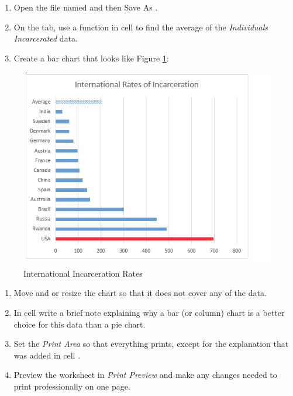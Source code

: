 \begin{enumbox}
	\begin{enumerate}
		\item Open the file named  and then Save As .
		\item On the  tab, use a function in cell  to find the average of the \textit{Individuals Incarcerated} data.
		\item Create a bar chart that looks like Figure \ref{04:fig56}:
	\end{enumerate}
\end{enumbox}
	
\begin{figure}[H]
	\centering
	\includegraphics[width=\maxwidth{.95\linewidth}]{gfx/ch04_fig56}
	\caption{International Incarceration Rates}
	\label{04:fig56}
\end{figure}

\begin{enumbox}
	\begin{enumerate}
		\item Move and or resize the chart so that it does not cover any of the data.
		\item In cell  write a brief note explaining why a bar (or column) chart is a better choice for this data than a pie chart.
		\item Set the \textit{Print Area} so that everything prints, except for the explanation that was added in cell .
		\item Preview the  worksheet in \textit{Print Preview} and make any changes needed to print professionally on one page.
	\end{enumerate}
\end{enumbox}

